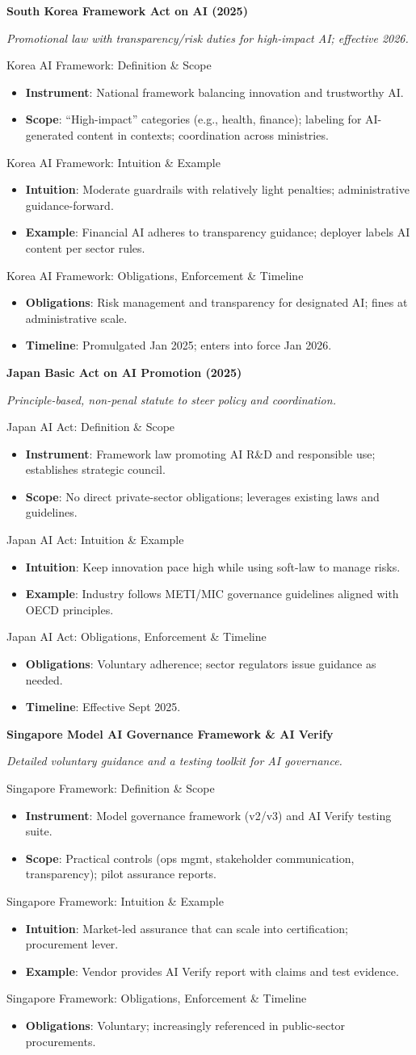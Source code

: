 \documentclass[aspectratio=169]{beamer}
\newcommand{\RegTitle}[2]{%
  \begin{frame}[plain]
    \centering
    \vfill
    {\usebeamerfont{title}\usebeamercolor[fg]{title}\LARGE \textbf{#1}\par}
    \vspace{0.4em}
    {\small \itshape #2\par}
    \vfill
  \end{frame}
}
\newcommand{\RegDef}[2]{%
  \begin{frame}{#1: Definition \& Scope}
    \begin{itemize}
      #2
    \end{itemize}
  \end{frame}
}
\newcommand{\RegIntuition}[2]{%
  \begin{frame}{#1: Intuition \& Example}
    \begin{itemize}
      #2
    \end{itemize}
  \end{frame}
}
\newcommand{\RegCompliance}[2]{%
  \begin{frame}{#1: Obligations, Enforcement \& Timeline}
    \begin{itemize}
      #2
    \end{itemize}
  \end{frame}
}
\begin{document}
\RegTitle{South Korea Framework Act on AI (2025)}{Promotional law with transparency/risk duties for high-impact AI; effective 2026.}
\RegDef{Korea AI Framework}{%
  \item \textbf{Instrument}: National framework balancing innovation and trustworthy AI.
  \item \textbf{Scope}: ``High-impact'' categories (e.g., health, finance); labeling for AI-generated content in contexts; coordination across ministries.
}
\RegIntuition{Korea AI Framework}{%
  \item \textbf{Intuition}: Moderate guardrails with relatively light penalties; administrative guidance-forward.
  \item \textbf{Example}: Financial AI adheres to transparency guidance; deployer labels AI content per sector rules.
}
\RegCompliance{Korea AI Framework}{%
  \item \textbf{Obligations}: Risk management and transparency for designated AI; fines at administrative scale.
  \item \textbf{Timeline}: Promulgated Jan 2025; enters into force Jan 2026.
}

\RegTitle{Japan Basic Act on AI Promotion (2025)}{Principle-based, non-penal statute to steer policy and coordination.}
\RegDef{Japan AI Act}{%
  \item \textbf{Instrument}: Framework law promoting AI R\&D and responsible use; establishes strategic council.
  \item \textbf{Scope}: No direct private-sector obligations; leverages existing laws and guidelines.
}
\RegIntuition{Japan AI Act}{%
  \item \textbf{Intuition}: Keep innovation pace high while using soft-law to manage risks.
  \item \textbf{Example}: Industry follows METI/MIC governance guidelines aligned with OECD principles.
}
\RegCompliance{Japan AI Act}{%
  \item \textbf{Obligations}: Voluntary adherence; sector regulators issue guidance as needed.
  \item \textbf{Timeline}: Effective Sept 2025.
}

\RegTitle{Singapore Model AI Governance Framework \& AI Verify}{Detailed voluntary guidance and a testing toolkit for AI governance.}
\RegDef{Singapore Framework}{%
  \item \textbf{Instrument}: Model governance framework (v2/v3) and AI Verify testing suite.
  \item \textbf{Scope}: Practical controls (ops mgmt, stakeholder communication, transparency); pilot assurance reports.
}
\RegIntuition{Singapore Framework}{%
  \item \textbf{Intuition}: Market-led assurance that can scale into certification; procurement lever.
  \item \textbf{Example}: Vendor provides AI Verify report with claims and test evidence.
}
\RegCompliance{Singapore Framework}{%
  \item \textbf{Obligations}: Voluntary; increasingly referenced in public-sector procurements.
}
\end{document}

